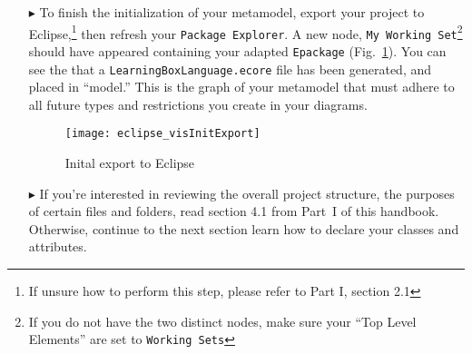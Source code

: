 \begin{itemize}
\newpage

\item[$\blacktriangleright$] To finish the initialization of your metamodel, export your project to Eclipse,\footnote{If unsure how to perform this step, please
refer to Part I, section 2.1} then refresh your \texttt{Package Explorer}. A new node, \texttt{My Working Set}\footnote{If you do not have the two
distinct nodes, make sure your ``Top Level Elements'' are set to \texttt{Working Sets}} should have appeared containing your adapted \texttt{Epackage}
(Fig.~\ref{fig:init_export}). You can see the that a \texttt{LearningBoxLanguage.ecore} file has been generated, and placed in ``model.'' This is the graph of
your metamodel that must adhere to all future types and restrictions you create in your diagrams.

\vspace{0.5cm}

\begin{figure}[htbp]
	\centering
  \texttt{[image: eclipse\_visInitExport]}
	\caption{Inital export to Eclipse}
	\label{fig:init_export}
\end{figure}
\FloatBarrier

\vspace{0.5cm}

\item[$\blacktriangleright$] If you're interested in reviewing the overall project structure, the purposes of certain files and folders, read section 4.1 from
Part~I of this handbook. Otherwise, continue to the next section learn how to declare your classes and attributes.

\end{itemize}
